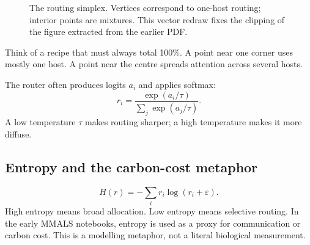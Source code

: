 \documentclass[11pt,a4paper]{article}
\begin{document}
\begin{figure}[H]
\centering
{}
\caption{The routing simplex. Vertices correspond to one-host routing; interior points are mixtures. This vector redraw fixes the clipping of the figure extracted from the earlier PDF.}
\label{fig:simplex-redraw}
\end{figure}

\begin{twelvebox}
Think of a recipe that must always total 100\%. A point near one corner uses mostly one host. A point near the centre spreads attention across several hosts.
\end{twelvebox}

\begin{engineerbox}
The router often produces logits $a_i$ and applies softmax:
\[
r_i=\frac{\exp(a_i/\tau)}{\sum_j\exp(a_j/\tau)}.
\]
A low temperature $\tau$ makes routing sharper; a high temperature makes it more diffuse.
\end{engineerbox}

\subsection{Entropy and the carbon-cost metaphor}

\[
H(r)=-\sum_i r_i\log(r_i+\varepsilon).
\]
High entropy means broad allocation. Low entropy means selective routing. In the early MMALS notebooks, entropy is used as a proxy for communication or carbon cost. This is a modelling metaphor, not a literal biological measurement.
\end{document}
